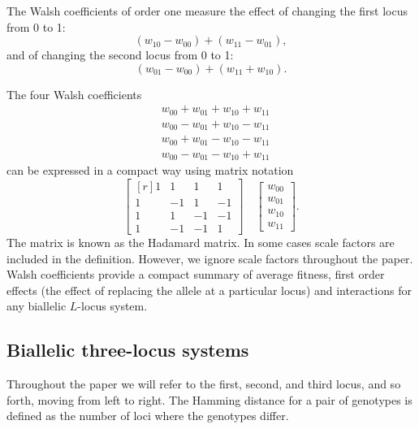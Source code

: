 \documentclass[12pt]{amsart}
\theoremstyle{plain}
\theoremstyle{definition}
\begin{document}
The Walsh coefficients of order one 
measure the effect of changing the first locus from 0 to 1:
\[
(w_{10}-w_{00})+(w_{11}-w_{01}),
\]
and of changing the second locus from 0 to 1:
\[
(w_{01}-w_{00})+(w_{11}+w_{10}).
\]



The four Walsh coefficients
\begin{align*}
&  w_{00} + w_{01} + w_{10} + w_{11}  \\
&  w_{00} - w_{01} + w_{10} -  w_{11} \\
&  w_{00} + w_{01} - w_{10} - w_{11}  \\
&  w_{00} - w_{01} - w_{10} +w_{11} 
\end{align*}
can be expressed in a compact way using matrix notation
\[
\begin{bmatrix*}[r]
 1  &1  & 1   &  1      \\
 1  &-1  & 1   &  -1     \\
 1  & 1  & -1   & - 1    \\ 
 1  & -1  &  -1   &  1        
\end{bmatrix*}
\quad
\begin{bmatrix}
 w_{00}   \\
 w_{01}    \\
 w_{10}   \\ 
w_{11}     
\end{bmatrix}.
\]
The matrix is known as the Hadamard matrix. 
In some cases scale factors are included
in the definition. However, we ignore scale factors throughout 
the paper. Walsh coefficients 
provide a compact summary of
average fitness, first order effects (the effect of replacing
the allele at a particular locus) and interactions
for any biallelic $L$-locus
system.



\subsection{Biallelic three-locus systems}
Throughout the paper we will refer to the first, second,
and third locus, and so forth, moving from left to right.
The Hamming distance for a pair of genotypes 
is defined as the number of loci where the
genotypes differ.
\end{document}
